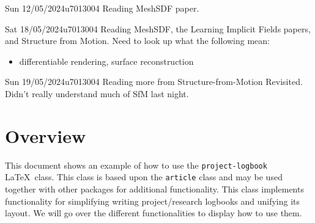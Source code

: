 \documentclass{project-logbook}
\begin{document}

\MakeFrontPage



\newpage

\begin{MeetingMinutes}{Sun 12/05/2024}{u7013004}
	Reading MeshSDF paper.
\end{MeetingMinutes}

\begin{MeetingMinutes}{Sat 18/05/2024}{u7013004}
	Reading MeshSDF, the Learning Implicit Fields papers, and Structure from Motion. Need to look up what the following mean:
	\begin{itemize}
		\item differentiable rendering, surface reconstruction
	\end{itemize}
\end{MeetingMinutes}

\begin{MeetingMinutes}{Sun 19/05/2024}{u7013004}
	Reading more from Structure-from-Motion Revisited. Didn't really understand much of SfM last night.
\end{MeetingMinutes}

\section{Overview} \label{sec:overview}
	This document shows an example of how to use the \texttt{project-logbook} \LaTeX~class. This class is based upon the \texttt{article} class and may be used together with other packages for additional functionality. This class implements functionality for simplifying writing project/research logbooks and unifying its layout. We will  go over the different functionalities to display how to use them.
\end{document}
